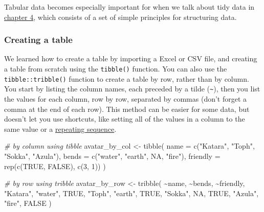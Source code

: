 \documentclass[
  oneside]{book}
\newenvironment{Shaded}{\begin{snugshade}}{\end{snugshade}}
\newcommand{\AttributeTok}[1]{\textcolor[rgb]{0.77,0.63,0.00}{#1}}
\newcommand{\CommentTok}[1]{\textcolor[rgb]{0.56,0.35,0.01}{\textit{#1}}}
\newcommand{\ConstantTok}[1]{\textcolor[rgb]{0.00,0.00,0.00}{#1}}
\newcommand{\DecValTok}[1]{\textcolor[rgb]{0.00,0.00,0.81}{#1}}
\newcommand{\FunctionTok}[1]{\textcolor[rgb]{0.00,0.00,0.00}{#1}}
\newcommand{\NormalTok}[1]{#1}
\newcommand{\OtherTok}[1]{\textcolor[rgb]{0.56,0.35,0.01}{#1}}
\newcommand{\SpecialCharTok}[1]{\textcolor[rgb]{0.00,0.00,0.00}{#1}}
\newcommand{\StringTok}[1]{\textcolor[rgb]{0.31,0.60,0.02}{#1}}
\begin{document}
Tabular data becomes especially important for when we talk about tidy data in \protect\hyperlink{tidyr}{chapter 4}, which consists of a set of simple principles for structuring data.

\hypertarget{creating-a-table}{%
\subsubsection{Creating a table}\label{creating-a-table}}

We learned how to create a table by importing a Excel or CSV file, and creating a table from scratch using the \texttt{tibble()} function. You can also use the \texttt{tibble::tribble()} function to create a table by row, rather than by column. You start by listing the column names, each preceded by a tilde (\texttt{\textasciitilde{}}), then you list the values for each column, row by row, separated by commas (don't forget a comma at the end of each row). This method can be easier for some data, but doesn't let you use shortcuts, like setting all of the values in a column to the same value or a \protect\hyperlink{rep_seq}{repeating sequence}.

\begin{Shaded}
\begin{Highlighting}[]
\CommentTok{\# by column using tibble}
\NormalTok{avatar\_by\_col }\OtherTok{\textless{}{-}} \FunctionTok{tibble}\NormalTok{(}
  \AttributeTok{name =} \FunctionTok{c}\NormalTok{(}\StringTok{"Katara"}\NormalTok{, }\StringTok{"Toph"}\NormalTok{, }\StringTok{"Sokka"}\NormalTok{, }\StringTok{"Azula"}\NormalTok{),}
  \AttributeTok{bends =} \FunctionTok{c}\NormalTok{(}\StringTok{"water"}\NormalTok{, }\StringTok{"earth"}\NormalTok{, }\ConstantTok{NA}\NormalTok{, }\StringTok{"fire"}\NormalTok{),}
  \AttributeTok{friendly =} \FunctionTok{rep}\NormalTok{(}\FunctionTok{c}\NormalTok{(}\ConstantTok{TRUE}\NormalTok{, }\ConstantTok{FALSE}\NormalTok{), }\FunctionTok{c}\NormalTok{(}\DecValTok{3}\NormalTok{, }\DecValTok{1}\NormalTok{))}
\NormalTok{)}

\CommentTok{\# by row using tribble}
\NormalTok{avatar\_by\_row }\OtherTok{\textless{}{-}} \FunctionTok{tribble}\NormalTok{(}
  \SpecialCharTok{\textasciitilde{}}\NormalTok{name,    }\SpecialCharTok{\textasciitilde{}}\NormalTok{bends, }\SpecialCharTok{\textasciitilde{}}\NormalTok{friendly,}
  \StringTok{"Katara"}\NormalTok{, }\StringTok{"water"}\NormalTok{,       }\ConstantTok{TRUE}\NormalTok{,}
  \StringTok{"Toph"}\NormalTok{,   }\StringTok{"earth"}\NormalTok{,       }\ConstantTok{TRUE}\NormalTok{,}
  \StringTok{"Sokka"}\NormalTok{,  }\ConstantTok{NA}\NormalTok{,            }\ConstantTok{TRUE}\NormalTok{,}
  \StringTok{"Azula"}\NormalTok{,  }\StringTok{"fire"}\NormalTok{,        }\ConstantTok{FALSE}
\NormalTok{)}
\end{Highlighting}
\end{Shaded}
\end{document}
